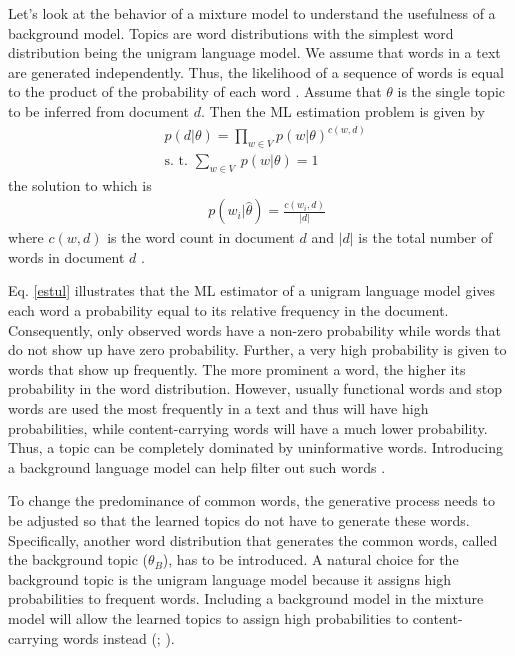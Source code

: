 \documentclass[11pt,a4paper,english,oneside]{book}
\numberwithin{equation}{chapter}
\begin{document}
Let's look at the behavior of a mixture model to understand the usefulness of a background model. Topics are word distributions with the simplest word distribution being the unigram language model. We assume that words in a text are generated independently. Thus, the likelihood of a sequence of words is equal to the product of the probability of each word \citep[pp. 51--54]{Zhai.2016}. Assume that $\theta$ is the single topic to be inferred from document $d$. Then the ML estimation problem is given by
\begin{align}
\label{ul} & p(d|\theta) = \underset{w \in V}\prod p(w|\theta)^{c(w,d)}\\
\label{constraintsul} & \text{s. t. } \underset{w \in V}{\sum} \ p(w|\theta) = 1
\end{align}
the solution to which is
\begin{align}
\label{estul} & \ p(w_i|\hat{\theta}) = \frac{c(w_i,d)}{|d|}
\end{align}
where $c(w,d)$ is the word count in document $d$ and $|d|$ is the total number of words in document $d$ \citep[pp. 341-343]{Zhai.2016}. 

Eq. \ref{estul} illustrates that the ML estimator of a unigram language model gives each word a probability equal to its relative frequency in the document. Consequently, only observed words have a non-zero probability while words that do not show up have zero probability. Further, a very high probability is given to words that show up frequently. The more prominent a word, the higher its probability in the word distribution. 
However, usually functional words and stop words are used the most frequently in a text and thus will have high probabilities, while content-carrying words will have a much lower probability. Thus, a topic can be completely dominated by uninformative words. Introducing a background language model can help filter out such words \citep[pp. 51--54]{Zhai.2016}.  

To change the predominance of common words, the generative process needs to be adjusted so that the learned topics do not have to generate these words. Specifically, another word distribution that generates the common words, called the background topic ($\theta_B$), has to be introduced. A natural choice for the background topic is the unigram language model because it assigns high probabilities to frequent words. Including a background model in the mixture model will allow the learned topics to assign high probabilities to content-carrying words instead (\citealp[pp.7--8]{Darling.2011}; \citealp{Chem.2007}).  
\end{document}
